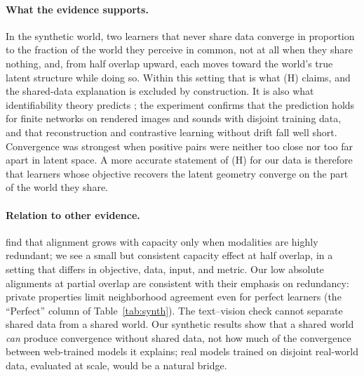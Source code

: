\documentclass[11pt]{article}
\begin{document}
\paragraph{What the evidence supports.} In the synthetic world, two learners that never share data converge in proportion to the fraction of the world they perceive in common, not at all when they share nothing, and, from half overlap upward, each moves toward the world's true latent structure while doing so. Within this setting that is what (H) claims, and the shared-data explanation is excluded by construction. It is also what identifiability theory predicts \citep{zimmermann2021contrastive,vonkugelgen2021self,daunhawer2023identifiability}; the experiment confirms that the prediction holds for finite networks on rendered images and sounds with disjoint training data, and that reconstruction and contrastive learning without drift fall well short. Convergence was strongest when positive pairs were neither too close nor too far apart in latent space. A more accurate statement of (H) for our data is therefore that learners whose objective recovers the latent geometry converge on the part of the world they share.

\paragraph{Relation to other evidence.} \citet{tjandrasuwita2025emergence} find that alignment grows with capacity only when modalities are highly redundant; we see a small but consistent capacity effect at half overlap, in a setting that differs in objective, data, input, and metric. Our low absolute alignments at partial overlap are consistent with their emphasis on redundancy: private properties limit neighborhood agreement even for perfect learners (the ``Perfect'' column of Table~\ref{tab:synth}). The text--vision check cannot separate shared data from a shared world. Our synthetic results show that a shared world \emph{can} produce convergence without shared data, not how much of the convergence between web-trained models it explains; real models trained on disjoint real-world data, evaluated at scale, would be a natural bridge.
\end{document}
